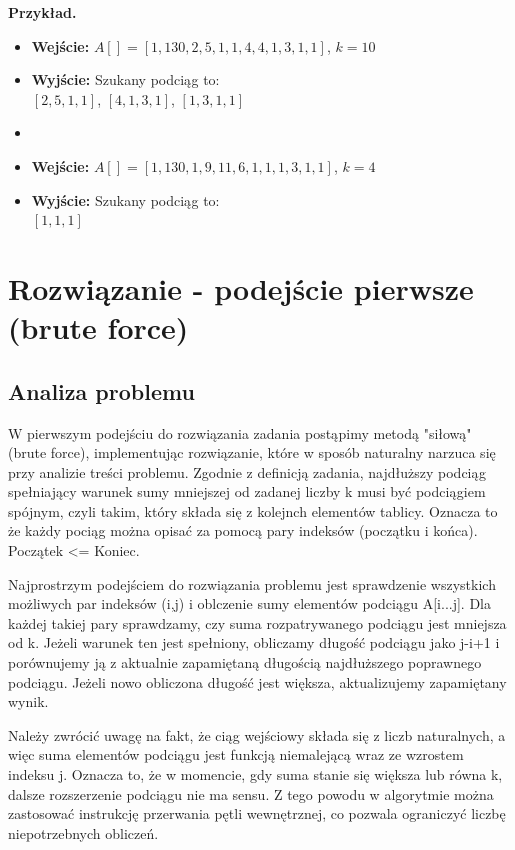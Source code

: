 \documentclass{article}
\begin{document}
\textbf{Przykład.}
\begin{itemize}
    \item[]\textbf{Wejście:} $A[] = [1, 130, 2, 5, 1, 1, 4, 4, 1, 3, 1, 1]$, $k = 10$
    \item[]\textbf{Wyjście:} Szukany podciąg to: \\ $[2, 5, 1, 1]$, $[4, 1, 3, 1]$, $[1, 3, 1, 1]$
    \item[] 
    \item[]\textbf{Wejście:} $A[] = [1, 130, 1, 9, 11, 6, 1, 1, 1, 3, 1, 1]$, $k = 4$
    \item[]\textbf{Wyjście:} Szukany podciąg to: \\ $[1, 1, 1]$
\end{itemize}

\section{Rozwiązanie - podejście pierwsze (brute force)}

\subsection{Analiza problemu}
W pierwszym podejściu do rozwiązania zadania postąpimy metodą "siłową" (brute force), implementując rozwiązanie, które w sposób naturalny narzuca się przy analizie treści problemu. Zgodnie z definicją zadania, najdłuższy podciąg spełniający warunek sumy mniejszej od zadanej liczby k musi być podciągiem spójnym, czyli takim, który składa się z kolejnch elementów tablicy. Oznacza to że każdy pociąg można opisać za pomocą pary indeksów (początku i końca). Początek <= Koniec.

Najprostrzym podejściem do rozwiązania problemu jest sprawdzenie wszystkich możliwych par indeksów (i,j) i oblczenie sumy elementów  podciągu A[i...j]. Dla każdej takiej pary sprawdzamy, czy suma rozpatrywanego podciągu jest mniejsza od k. Jeżeli warunek ten jest spełniony, obliczamy długość podciągu jako j-i+1 i porównujemy ją z aktualnie zapamiętaną długością najdłuższego poprawnego podciągu. Jeżeli nowo obliczona długość jest większa, aktualizujemy zapamiętany wynik.

Należy zwrócić uwagę na fakt, że ciąg wejściowy składa się z liczb naturalnych, a więc suma elementów podciągu jest funkcją niemalejącą wraz ze wzrostem indeksu j. Oznacza to, że w momencie, gdy suma stanie się większa lub równa k, dalsze rozszerzenie podciągu nie ma sensu. Z tego powodu w algorytmie można zastosować instrukcję przerwania pętli wewnętrznej, co pozwala ograniczyć liczbę niepotrzebnych obliczeń.
\end{document}
